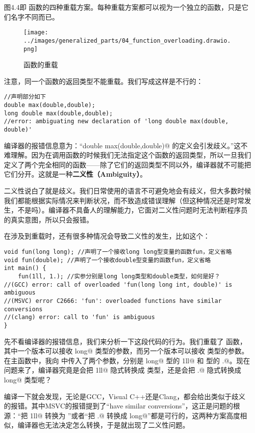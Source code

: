 图4.4即 \lstinline@max@ 函数的四种重载方案。每种重载方案都可以视为一个独立的函数，只是它们名字不同而已。\par
\begin{figure}[htbp]
    \centering
    \texttt{[image: ../images/generalized\_parts/04\_function\_overloading.drawio.png]}
    \caption{\lstinline@max@ 函数的重载}
\end{figure}
注意，同一个函数的返回类型不能重载。我们写成这样是不行的：
\begin{lstlisting}
//声明部分如下
double max(double,double);
long double max(double,double);
//error: ambiguating new declaration of 'long double max(double, double)'
\end{lstlisting}
编译器的报错信息意为：``\lstinline@long double max(double,double)@ 的定义会引发歧义。''这不难理解。因为在调用函数的时候我们无法指定这个函数的返回类型，所以一旦我们定义了两个完全相同的函数——除了它们的返回类型不同以外，编译器就不可能把它们分开。这就是一种\textbf{二义性（Ambiguity）}。\par
二义性说白了就是歧义。我们日常使用的语言不可避免地会有歧义，但大多数时候我们都能根据实际情况来判断状况，而不致造成错误理解（但这种情况还是时常发生，不是吗）。编译器不具备人的理解能力，它面对二义性问题时无法判断程序员的真实意图，所以只会报错。\par
在涉及到重载时，还有很多种情况会导致二义性的发生，比如这个：
\begin{lstlisting}
void fun(long long); //声明了一个接收long long型变量的函数fun，定义省略
void fun(double); //声明了一个接收double型变量的函数fun，定义省略
int main() {
    fun(1ll, 1.); //实参分别是long long类型和double类型，如何是好？
//(GCC) error: call of overloaded 'fun(long long int, double)' is ambiguous
//(MSVC) error C2666: 'fun': overloaded functions have similar conversions
//(clang) error: call to 'fun' is ambiguous
}
\end{lstlisting}
先不看编译器的报错信息，我们来分析一下这段代码的行为。我们重载了 \lstinline@fun@ 函数，其中一个版本可以接收 \lstinline@long long@ 类型的参数，而另一个版本可以接收 \lstinline@double@ 类型的参数。在主函数中，我向 \lstinline@fun@ 中传入了两个参数，分别是 \lstinline@long long@ 型的 \lstinline@1ll@ 和 \lstinline@double@ 型的 .@。现在问题来了，编译器究竟是会把 \lstinline@1ll@ 隐式转换成 \lstinline@double@ 类型，还是会把 .@ 隐式转换成 \lstinline@long long@ 类型呢？\par
编译一下就会发现，无论是GCC，Visual C++还是Clang，都会给出类似于歧义的报错。其中MSVC的报错提到了``have similar conversions''，这正是问题的根源：``把 \lstinline@1ll@ 转换为 \lstinline@double@''或者``把 .@ 转换成 \lstinline@long long@''都是可行的，这两种方案高度相似，编译器也无法决定怎么转换，于是就出现了二义性问题。\par
